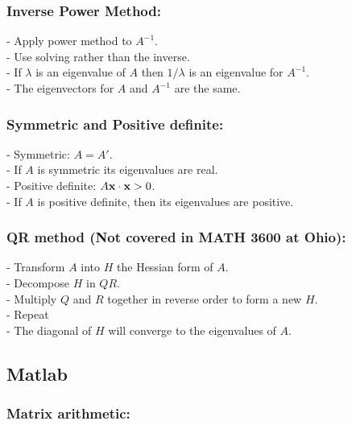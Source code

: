 \subsubsection*{Inverse Power Method:}
- Apply power method to $A^{-1}$.\\
- Use solving rather than the inverse.\\
- If $\lambda$ is an eigenvalue  of $A$ then $1/\lambda$ is an eigenvalue  for $A^{-1}$.\\
- The eigenvectors for $A$ and $A^{-1}$ are the same.

\subsubsection*{Symmetric and Positive definite:}
- Symmetric: $A = A'$.\\
- If $A$ is symmetric its eigenvalues are real.\\
- Positive definite: $A\mathbf{x} \cdot \mathbf{x} >0$.\\
- If $A$ is positive definite, then its eigenvalues are positive.


\subsubsection*{QR method (Not covered in MATH 3600 at Ohio):}
- Transform $A$ into $H$ the Hessian form of $A$.\\
- Decompose $H$ in $QR$.\\
- Multiply $Q$ and $R$ together in reverse order to form a new $H$.\\
- Repeat\\
- The diagonal of $H$ will converge to the eigenvalues of $A$.


\subsection*{Matlab}

\subsubsection*{Matrix arithmetic:}

